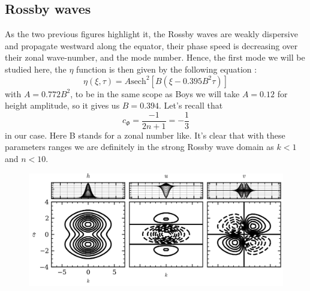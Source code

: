 \documentclass[11pt,a4paper]{report}
\begin{document}
\begin{multicols}{2}
    \subsection{Rossby waves}
    As the two previous figures highlight it, the Rossby waves are weakly dispersive and propagate westward along the equator, their phase speed is decreasing over their zonal wave-number, and the mode number. Hence, the first mode we will be studied here,
    the $\eta$ function is then given by the following equation :
    \begin{equation}
        \label{eq:8}
        \eta(\xi, \tau) = A \text{sech}^2[B(\xi - 0.395B^2\tau)]
    \end{equation}
    with $A = 0.772 B^2$, to be in the same scope as Boys we will take $A = 0.12$ for height amplitude, so it gives us $B = 0.394$. Let's recall that $$c_\Phi = \frac{-1}{2n + 1} = -\frac{1}{3}$$ in our case. Here B stands for a zonal number like. It's clear that with these parameters ranges we are definitely in the strong Rossby wave domain as $k<1$ and $n<10$.
    \begin{figure}[H]
        \hspace*{-.5cm}\includegraphics[width=1.1\linewidth]{./figure/initial_data.png}
    \end{figure}


\end{multicols}
\end{document}
